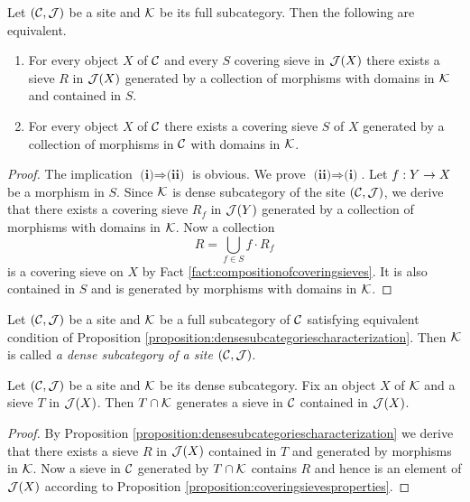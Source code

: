 \begin{proposition}\label{proposition:densesubcategoriescharacterization}
Let $({\mathcal C},{\mathcal J})$ be a site and ${\mathcal K}$ be its full subcategory. Then the following are equivalent.
\begin{enumerate}[label=\emph{\textbf{(\roman*)}}, leftmargin=1.5em]
\item For every object $X$ of ${\mathcal C}$ and every $S$ covering sieve in ${\mathcal J}(X)$ there exists a sieve $R$ in ${\mathcal J}(X)$ generated by a collection of morphisms with domains in ${\mathcal K}$ and contained in $S$.
\item For every object $X$ of ${\mathcal C}$ there exists a covering sieve $S$ of $X$ generated by a collection of morphisms in ${\mathcal C}$ with domains in ${\mathcal K}$.
\end{enumerate}
\end{proposition}
\begin{proof}
The implication $\textbf{(i)}\Rightarrow \textbf{(ii)}$ is obvious. We prove $\textbf{(ii)}\Rightarrow \textbf{(i)}$. Let $f:Y\rightarrow X$ be a morphism in $S$. Since ${\mathcal K}$ is dense subcategory of the site $({\mathcal C},{\mathcal J})$, we derive that there exists a covering sieve $R_f$ in ${\mathcal J}(Y)$ generated by a collection of morphisms with domains in ${\mathcal K}$. Now a collection
$$R = \bigcup_{f\in S}f\cdot R_f$$
is a covering sieve on $X$ by Fact \ref{fact:compositionofcoveringsieves}. It is also contained in $S$ and is generated by morphisms with domains in ${\mathcal K}$.
\end{proof}

\begin{definition}
Let $({\mathcal C}, {\mathcal J})$ be a site and ${\mathcal K}$ be a full subcategory of ${\mathcal C}$ satisfying equivalent condition of Proposition \ref{proposition:densesubcategoriescharacterization}. Then ${\mathcal K}$ is called \textit{a dense subcategory of a site $({\mathcal C},{\mathcal J})$}.
\end{definition}

\begin{corollary}\label{corollary:sievesondense}
Let $({\mathcal C},{\mathcal J})$ be a site and ${\mathcal K}$ be its dense subcategory. Fix an object $X$ of ${\mathcal K}$ and a sieve $T$ in ${\mathcal J}(X)$. Then $T\cap {\mathcal K}$ generates a sieve in ${\mathcal C}$ contained in ${\mathcal J}(X)$.
\end{corollary}
\begin{proof}
By Proposition \ref{proposition:densesubcategoriescharacterization} we derive that there exists a sieve $R$ in ${\mathcal J}(X)$ contained in $T$ and generated by morphisms in ${\mathcal K}$. Now a sieve in ${\mathcal C}$ generated by $T\cap {\mathcal K}$ contains $R$ and hence is an element of ${\mathcal J}(X)$ according to Proposition \ref{proposition:coveringsievesproperties}.
\end{proof}

